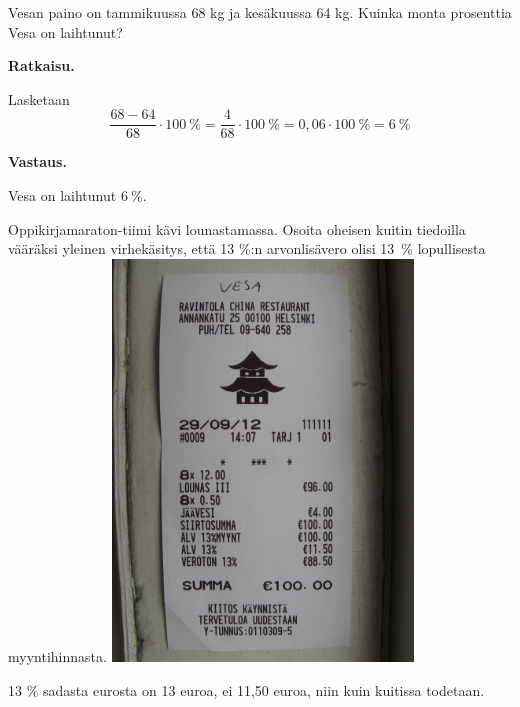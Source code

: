\begin{esimerkki}
Vesan paino on tammikuussa 68 kg ja kesäkuussa 64 kg. Kuinka monta prosenttia Vesa on laihtunut?

\textbf{Ratkaisu.}

Lasketaan 
\begin{equation*}
\frac{68-64}{68}\cdot 100\ \% = \frac{4}{68} \cdot 100\ \%=0,06\cdot 100\ \% = 6\ \%
\end{equation*}

\textbf{Vastaus.}

Vesa on laihtunut $6\ \%$.
\end{esimerkki}

\begin{tehtava}

Oppikirjamaraton-tiimi kävi lounastamassa. Osoita oheisen kuitin tiedoilla vääräksi yleinen virhekäsitys, että 13 \%:n arvonlisävero olisi 13~\% lopullisesta myyntihinnasta.
\includegraphics[width=80mm, angle=270]{02-yhtalot/kuvia/alv-kuitti}

\begin{vastaus}
13 \% sadasta eurosta on 13 euroa, ei 11,50 euroa, niin kuin kuitissa todetaan.
\end{vastaus}


\end{tehtava}



